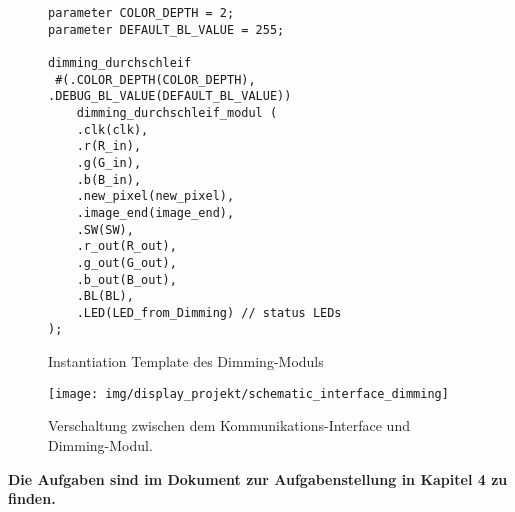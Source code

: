 \begin{figure}[H]
\lstset{style=verilog-style}
\begin{lstlisting}
parameter COLOR_DEPTH = 2;
parameter DEFAULT_BL_VALUE = 255;

dimming_durchschleif
 #(.COLOR_DEPTH(COLOR_DEPTH), .DEBUG_BL_VALUE(DEFAULT_BL_VALUE))  
    dimming_durchschleif_modul (
    .clk(clk),
    .r(R_in), 
    .g(G_in),
    .b(B_in),
    .new_pixel(new_pixel),
    .image_end(image_end),
    .SW(SW),
    .r_out(R_out),
    .g_out(G_out),
    .b_out(B_out),
    .BL(BL),
    .LED(LED_from_Dimming) // status LEDs
);
\end{lstlisting}
\caption{Instantiation Template des Dimming-Moduls}
\label{code:instantiation_dimming}
\end{figure}
\begin{figure}[H]
\centering
\texttt{[image: img/display\_projekt/schematic\_interface\_dimming]}
\caption{Verschaltung zwischen dem Kommunikations-Interface und Dimming-Modul.} 
\label{fig:display_schematic_interface_dimming}
\end{figure}
\textbf{Die Aufgaben sind im Dokument zur Aufgabenstellung in Kapitel 4 zu finden.}
